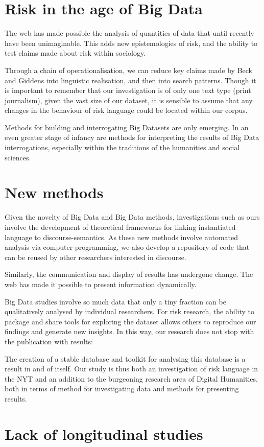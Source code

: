 \section{Risk in the age of Big Data}

The web has made possible the analysis of quantities of data that until recently have been unimaginable. This adds new epistemologies of risk, and the ability to test claims made about risk within sociology. 

Through a chain of operationalisation, we can reduce key claims made by Beck and Giddens into linguistic realisation, and then into search patterns. Though it is important to remember that our investigation is of only one text type (print journalism), given the vast size of our dataset, it is sensible to assume that any changes in the behaviour of risk language could be located within our corpus.

Methods for building and interrogating Big Datasets are only emerging. In an even greater stage of infancy are methods for interpreting the results of Big Data interrogations, especially within the traditions of the humanities and social sciences.

\section{New methods}

Given the novelty of Big Data and Big Data methods, investigations such as ours involve the development of theoretical frameworks for linking instantiated language to discourse-semantics. As these new methods involve automated analysis via computer programming, we also develop a repository of code that can be reused by other researchers interested in discourse. 

Similarly, the communication and display of results has undergone change. The web has made it possible to present information dynamically.

Big Data studies involve so much data that only a tiny fraction can be qualitatively analysed by individual researchers. For risk research, the ability to package and share tools for exploring the dataset allows others to reproduce our findings and generate new insights. In this way, our research does not stop with the publication with results: 

The creation of a stable database and toolkit for analysing this database is a result in and of itself. Our study is thus both an investigation of risk language in the NYT and an addition to the burgeoning research area of Digital Humanities, both in terms of method for investigating data and methods for presenting results.


\section{Lack of longitudinal studies}



%